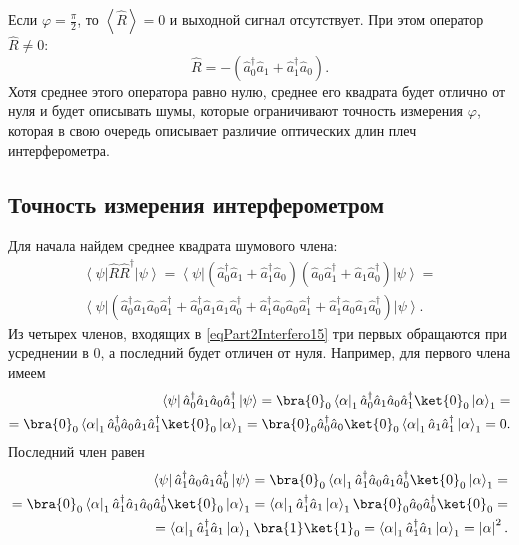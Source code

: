 Если $\varphi = \frac{\pi}{2}$, то $\left<\hat{R}\right> = 0$ и
выходной сигнал отсутствует. При этом оператор $\hat{R} \ne 0$:
\[
\hat{R} = 
-
\left(
\hat{a}_0^{\dag} \hat{a}_1 + 
\hat{a}_1^{\dag} \hat{a}_0
\right).
\]
Хотя среднее этого оператора равно нулю, среднее его квадрата будет
отлично от нуля и будет описывать шумы, которые ограничивают точность
измерения $\varphi$, которая в свою очередь описывает различие
оптических длин плеч интерферометра.

\subsection{Точность измерения интерферометром}

Для начала найдем среднее квадрата шумового члена:
\begin{eqnarray}
\left<\psi\right|\hat{R}\hat{R}^{\dag}\left|\psi\right> = 
\left<\psi\right|
\left(
\hat{a}_0^{\dag} \hat{a}_1 + 
\hat{a}_1^{\dag} \hat{a}_0
\right)
\left(
\hat{a}_0 \hat{a}_1^{\dag} +
\hat{a}_1 \hat{a}_0^{\dag}
\right)
\left|\psi\right> = 
\nonumber \\
\left<\psi\right|
\left(
\hat{a}_0^{\dag} \hat{a}_1 
\hat{a}_0 \hat{a}_1^{\dag} 
+ 
\hat{a}_0^{\dag} \hat{a}_1 
\hat{a}_1 \hat{a}_0^{\dag}
+
\hat{a}_1^{\dag} \hat{a}_0
\hat{a}_0 \hat{a}_1^{\dag} 
+
\hat{a}_1^{\dag} \hat{a}_0
\hat{a}_1 \hat{a}_0^{\dag}
\right)
\left|\psi\right>.
\label{eqPart2Interfero15}
\end{eqnarray}
Из четырех членов, входящих в \eqref{eqPart2Interfero15} три первых
обращаются при усреднении в 0, а последний будет отличен от нуля.
Например, для первого члена имеем
\begin{eqnarray}
\left<\psi\right|
\hat{a}_0^{\dag} \hat{a}_1 
\hat{a}_0 \hat{a}_1^{\dag} 
\left|\psi\right> = 
\bra{0}_0\left<\alpha\right|_1
\hat{a}_0^{\dag} \hat{a}_1 
\hat{a}_0 \hat{a}_1^{\dag} 
\ket{0}_0\left|\alpha\right>_1 =
\nonumber \\
=
\bra{0}_0\left<\alpha\right|_1
\hat{a}_0^{\dag} \hat{a}_0 
\hat{a}_1 \hat{a}_1^{\dag} 
\ket{0}_0\left|\alpha\right>_1 =
\bra{0}_0
\hat{a}_0^{\dag} \hat{a}_0 
\ket{0}_0
\left<\alpha\right|_1
\hat{a}_1 \hat{a}_1^{\dag} 
\left|\alpha\right>_1 =
0.
\nonumber
\end{eqnarray}
Последний член равен
\begin{eqnarray}
\left<\psi\right|
\hat{a}_1^{\dag} \hat{a}_0
\hat{a}_1 \hat{a}_0^{\dag}
\left|\psi\right> = 
\bra{0}_0\left<\alpha\right|_1
\hat{a}_1^{\dag} \hat{a}_0
\hat{a}_1 \hat{a}_0^{\dag}
\ket{0}_0\left|\alpha\right>_1 =
\nonumber \\
=
\bra{0}_0\left<\alpha\right|_1
\hat{a}_1^{\dag} \hat{a}_1 
\hat{a}_0 \hat{a}_0^{\dag}
\ket{0}_0\left|\alpha\right>_1 =
\left<\alpha\right|_1
\hat{a}_1^{\dag} \hat{a}_1 
\left|\alpha\right>_1 
\bra{0}_0
\hat{a}_0 \hat{a}_0^{\dag}
\ket{0}_0 =
\nonumber \\
=
\left<\alpha\right|_1
\hat{a}_1^{\dag} \hat{a}_1 
\left|\alpha\right>_1 
\bra{1}
\ket{1}_0 =
\left<\alpha\right|_1
\hat{a}_1^{\dag} \hat{a}_1 
\left|\alpha\right>_1 
= \left|\alpha\right|^2.
\end{eqnarray}
